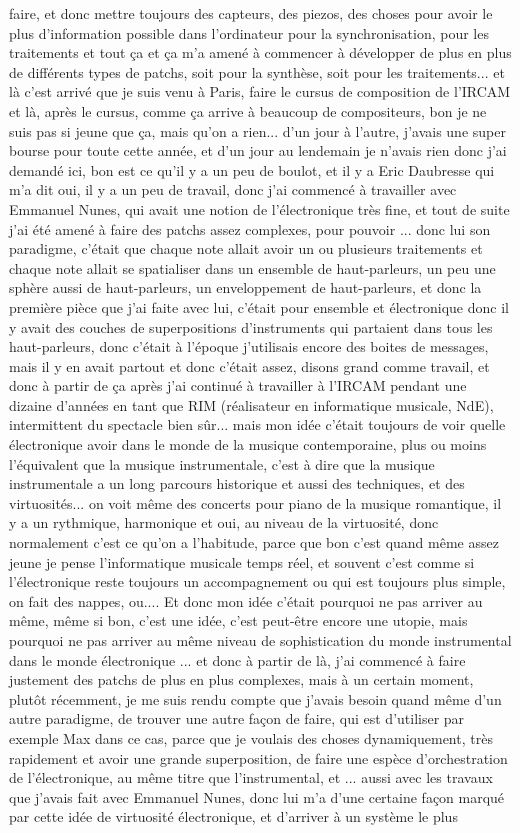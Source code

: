 faire, et donc mettre toujours des capteurs, des piezos, des choses pour avoir le plus d'information possible dans l'ordinateur pour la synchronisation, pour les traitements et tout ça et ça m'a amené à commencer à développer de plus en plus de différents types de patchs, soit pour la synthèse, soit pour les traitements... et là c'est arrivé que je suis venu à Paris, faire le cursus de composition de l'IRCAM et là, après le cursus, comme ça arrive à beaucoup de compositeurs, bon je ne suis pas si jeune que ça, mais qu'on a rien... d'un jour à l'autre, j'avais une super bourse pour toute cette année, et d'un jour au lendemain je n'avais rien donc j'ai demandé ici, bon est ce qu'il y a un peu de boulot, et il y a Eric Daubresse qui m'a dit oui, il y a un peu de travail, donc j'ai commencé à travailler avec Emmanuel Nunes, qui avait une notion de l'électronique très fine, et tout de suite j'ai été amené à faire des patchs assez complexes, pour pouvoir ... donc lui son paradigme, c'était que chaque note allait avoir un ou plusieurs traitements et chaque note allait se spatialiser dans un ensemble de haut-parleurs, un peu une sphère aussi de haut-parleurs, un enveloppement de haut-parleurs, et donc la première pièce que j'ai faite avec lui, c'était pour ensemble et électronique donc il y avait des couches de superpositions d'instruments qui partaient dans tous les haut-parleurs, donc c'était à l'époque j'utilisais encore des boites de messages, mais il y en avait partout et donc c'était assez, disons grand comme travail, et donc à partir de ça après j'ai continué à travailler à l'IRCAM pendant une dizaine d'années en tant que RIM (réalisateur en informatique musicale, NdE), intermittent du spectacle bien sûr... mais mon idée c'était toujours de voir quelle électronique avoir dans le monde de la musique contemporaine, plus ou moins l'équivalent que la musique instrumentale, c'est à dire que la musique instrumentale a un long parcours historique et aussi des techniques, et des virtuosités... on voit même des concerts pour piano de la musique romantique, il y a un rythmique, harmonique et oui, au niveau de la virtuosité, donc normalement c'est ce qu'on a l'habitude, parce que bon c'est quand même assez jeune je pense l'informatique musicale temps réel, et souvent c'est comme si l'électronique reste toujours un accompagnement ou qui est toujours plus simple, on fait des nappes, ou.... Et donc mon idée c'était pourquoi ne pas arriver au même, même si bon, c'est une idée, c'est peut-être encore une utopie, mais pourquoi ne pas arriver au même niveau de sophistication du monde instrumental dans le monde électronique ... et donc à partir de là, j'ai commencé à faire justement des patchs de plus en plus complexes, mais à un certain moment, plutôt récemment, je me suis rendu compte que j'avais besoin quand même d'un autre paradigme, de trouver une autre façon de faire, qui est d'utiliser par exemple Max dans ce cas, parce que je voulais des choses dynamiquement, très rapidement et avoir une grande superposition, de faire une espèce d'orchestration de l'électronique, au même titre que l'instrumental, et ... aussi avec les travaux que j'avais fait avec Emmanuel Nunes, donc lui m'a d'une certaine façon marqué par cette idée de virtuosité électronique, et d'arriver à un système le plus 